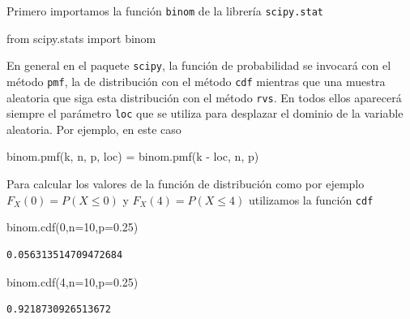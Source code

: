 \documentclass[
  letterpaper,
  DIV=11,
  numbers=noendperiod]{scrreprt}
\newenvironment{Shaded}{\begin{snugshade}}{\end{snugshade}}
\newcommand{\DecValTok}[1]{\textcolor[rgb]{0.68,0.00,0.00}{#1}}
\newcommand{\FloatTok}[1]{\textcolor[rgb]{0.68,0.00,0.00}{#1}}
\newcommand{\ImportTok}[1]{\textcolor[rgb]{0.00,0.46,0.62}{#1}}
\newcommand{\NormalTok}[1]{\textcolor[rgb]{0.00,0.23,0.31}{#1}}
\newcommand{\OperatorTok}[1]{\textcolor[rgb]{0.37,0.37,0.37}{#1}}
\begin{document}
Primero importamos la función \texttt{binom} de la librería
\texttt{scipy.stat}

\begin{Shaded}
\begin{Highlighting}[]
\ImportTok{from}\NormalTok{ scipy.stats }\ImportTok{import}\NormalTok{ binom}
\end{Highlighting}
\end{Shaded}

En general en el paquete \texttt{scipy}, la función de probabilidad se
invocará con el método \texttt{pmf}, la de distribución con el método
\texttt{cdf} mientras que una muestra aleatoria que siga esta
distribución con el método \texttt{rvs}. En todos ellos aparecerá
siempre el parámetro \texttt{loc} que se utiliza para desplazar el
dominio de la variable aleatoria. Por ejemplo, en este caso

\begin{Shaded}
\begin{Highlighting}[]
\NormalTok{binom.pmf(k, n, p, loc) }\OperatorTok{=}\NormalTok{  binom.pmf(k }\OperatorTok{{-}}\NormalTok{ loc, n, p)}
\end{Highlighting}
\end{Shaded}

Para calcular los valores de la función de distribución como por ejemplo
\(F_X(0)=P(X\leq 0)\) y \(F_X(4)=P(X\leq 4)\) utilizamos la función
\texttt{cdf}

\begin{Shaded}
\begin{Highlighting}[]
\NormalTok{binom.cdf(}\DecValTok{0}\NormalTok{,n}\OperatorTok{=}\DecValTok{10}\NormalTok{,p}\OperatorTok{=}\FloatTok{0.25}\NormalTok{)}
\end{Highlighting}
\end{Shaded}

\begin{verbatim}
0.056313514709472684
\end{verbatim}

\begin{Shaded}
\begin{Highlighting}[]
\NormalTok{binom.cdf(}\DecValTok{4}\NormalTok{,n}\OperatorTok{=}\DecValTok{10}\NormalTok{,p}\OperatorTok{=}\FloatTok{0.25}\NormalTok{)}
\end{Highlighting}
\end{Shaded}

\begin{verbatim}
0.9218730926513672
\end{verbatim}
\end{document}
